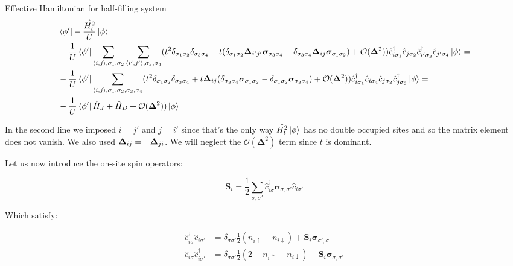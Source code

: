 \begin{section}{Effective Hamiltonian for half-filling system}
\begin{align}
\label{PertNoEMF}
&\bra{\phi'} -\frac{\hat{H_t^2}}{U} \ket{\phi} = \nonumber \\
&-\frac{1}{U} \bra{\phi'} \sum_{\langle i,j \rangle, \sigma_1, \sigma_2} \sum_{\langle i',j' \rangle, 					\sigma_3, \sigma_4} (t^2 \delta_{\sigma_1 \sigma_2}\delta_{\sigma_3 \sigma_4} + t(\delta_{\sigma_1 \sigma_2}		\boldsymbol{\Delta}_{i'j'}\boldsymbol{\sigma}_{\sigma_3 \sigma_4} + \delta_{\sigma_3 \sigma_4}						\boldsymbol{\Delta}_{ij}\boldsymbol{\sigma}_{\sigma_1 \sigma_2}) + \mathcal{O}(\boldsymbol{\Delta}^2)) 				\hat{c}_{i\sigma_1}^\dagger \hat{c}_{j \sigma_2} \hat{c}_{i' \sigma_3}^\dagger \hat{c}_{j'\sigma_4}					\ket{\phi} = \nonumber \\
&-\frac{1}{U} \bra{\phi'} \sum_{\langle i,j \rangle, \sigma_1, \sigma_2, \sigma_3, \sigma_4} (t^2 						\delta_{\sigma_1 \sigma_2}\delta_{\sigma_3 \sigma_4} + t\boldsymbol{\Delta}_{ij}(\delta_{\sigma_3 \sigma_4}			\boldsymbol{\sigma}_{\sigma_1 \sigma_2} - \delta_{\sigma_1 \sigma_2} \boldsymbol{\sigma}_{\sigma_3 					\sigma_4}) + \mathcal{O}(\boldsymbol{\Delta}^2)) \hat{c}_{i\sigma_1}^\dagger \hat{c}_{i\sigma_4} \hat{c}_{j 		\sigma_2} \hat{c}_{j \sigma_3}^\dagger \ket{\phi} = \nonumber \\
&-\frac{1}{U} \bra{\phi'} \hat{H}_J + \hat{H}_D + \mathcal{O}(\boldsymbol{\Delta}^2))\ket{\phi}
\end{align}

In the second line we imposed $i=j'$ and $j=i'$ since that's the only way $\hat{H_t^2}\ket{\phi}$ has no double occupied sites and so the matrix element does not vanish. We also used $\boldsymbol{\Delta}_{ij} = - \boldsymbol{\Delta}_{ji}$. We will neglect the $\mathcal{O}(\boldsymbol{\Delta}^2)$ term since $t$ is dominant.

Let us now introduce the on-site spin operators:

\begin{equation}
\boldsymbol{S}_i = \frac{1}{2} \sum_{\sigma, \sigma'} \hat{c}_{i \sigma}^\dagger \boldsymbol{\sigma}_{\sigma, \sigma'} \hat{c}_{i \sigma'}
\end{equation}

Which satisfy:

\begin{align*}
\hat{c}_{i \sigma}^\dagger \hat{c}_{i \sigma'} &= \delta_{\sigma \sigma'} \frac{1}{2} (n_{i \uparrow} + n_{i \downarrow}) + \boldsymbol{S}_i\boldsymbol{\sigma}_{\sigma', \sigma} \\ 
\hat{c}_{i \sigma} \hat{c}_{i \sigma'}^\dagger &= \delta_{\sigma \sigma'} \frac{1}{2} (2 - n_{i \uparrow} - n_{i \downarrow}) - \boldsymbol{S}_i\boldsymbol{\sigma}_{\sigma, \sigma'} 
\end{align*}


\end{section}
